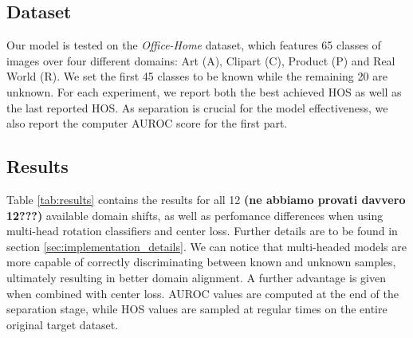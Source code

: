 \documentclass[10pt,twocolumn,letterpaper]{article}
\begin{document}
\subsection{Dataset}
\label{sec:dataset}

Our model is tested on the {\it Office-Home} dataset\cite{OfficeHomeDataset}, 
which features 65 classes of images over four different domains: Art (A), Clipart (C), Product (P) and Real World (R).
We set the first 45 classes to be known while the remaining 20 are unknown.
For each experiment, 
we report both the best achieved HOS as well as the last reported HOS.
As separation is crucial for the model effectiveness,
 we also report the computer AUROC score for the first part.

\subsection{Results}
\label{sec:results}
Table \ref{tab:results} contains the results for all 12 {\bf (ne abbiamo provati davvero 12???)} available domain shifts,
as well as perfomance differences when using multi-head rotation classifiers and center loss.
Further details are to be found in section \ref{sec:implementation_details}.
We can notice that multi-headed models are more capable of correctly discriminating between known and unknown samples,
ultimately resulting in better domain alignment.
A further advantage is given when combined with center loss.
AUROC values are computed at the end of the separation stage, 
while HOS values are sampled at regular times on the entire original target dataset.
\end{document}

